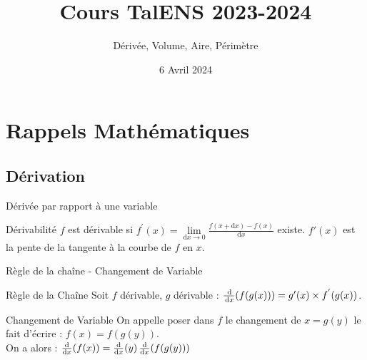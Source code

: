 \documentclass{../beamercours}
\title{Cours TalENS 2023-2024}
\subtitle{Dérivée, Volume, Aire, Périmètre}
\date{6 Avril 2024}
\begin{document}
\maketitle
\section{Rappels Mathématiques}
\subsection{Dérivation}
\begin{frame}{Dérivée par rapport à une variable}
\begin{définition}{Dérivabilité}{}
$f$ est dérivable si $f^{'}(x) = \lim\limits_{\mathrm{d}x \rightarrow 0} \frac{f(x + \mathrm{d}x) - f(x)}{\mathrm{d}x}$ existe. $f'(x)$ est la pente de la tangente à la courbe de $f$ en $x$.
\end{définition}
\end{frame}

\begin{frame}{Règle de la chaîne - Changement de Variable}
\begin{théorème}{Règle de la Chaîne}{}
Soit $f$ dérivable, $g$ dérivable : $\frac{{\rm \, d}}{{\rm \, d} x}(f(g(x))) = g'(x) \times f^{'}(g(x))$.
\end{théorème}
\begin{définition}{Changement de Variable}{}
On appelle poser dans $f$ le changement de $x = g(y)$ le fait d'écrire : $f(x) = f(g(y))$.\\ On a alors : $\frac{\mathrm{d}}{\mathrm{d}x}\!\left(f(x)\right) = \frac{\mathrm{d}}{\mathrm{d}x}\!\left(y\right)\frac{\mathrm{d}}{\mathrm{d}x}\!\left(f(g(y))\right)$
\end{définition}

\end{frame}
\end{document}

